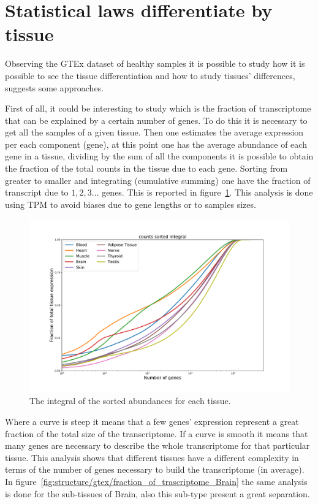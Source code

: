 \section{Statistical laws differentiate by tissue}
Observing the GTEx dataset of healthy samples it is possible to study how it is possible to see the tissue differentiation and how to study tissues' differences,~\cite{mele2014} suggests some approaches.

First of all, it could be interesting to study which is the fraction of transcriptome that can be explained by a certain number of genes.
To do this it is necessary to get all the samples of a given tissue. Then one estimates the average expression per each component (gene), at this point one has the average abundance of each gene in a tissue, dividing by the sum of all the components it is possible to obtain the fraction of the total counts in the tissue due to each gene. Sorting from greater to smaller and integrating (cumulative summing) one have the fraction of transcript due to $1, 2, 3\dots$ genes. This is reported in figure~\ref{fig:structure/gtex/fraction_of_trascriptome}. This analysis is done using TPM to avoid biases due to gene lengths or to samples sizes.
\begin{figure}[htb!]
  \centering
  \includegraphics[width=0.7\linewidth]{pictures/structure/gtex/fraction_of_trascriptome.pdf}
  \caption{The integral of the sorted abundances for each tissue.}
  \label{fig:structure/gtex/fraction_of_trascriptome}
\end{figure}
Where a curve is steep it means that a few genes' expression represent a great fraction of the total size of the transcriptome. If a curve is smooth it means that many genes are necessary to describe the whole transcriptome for that particular tissue. This analysis shows that different tissues have a different complexity in terms of the number of genes necessary to build the transcriptome (in average). In figure~\ref{fig:structure/gtex/fraction_of_trascriptome_Brain} the same analysis is done for the sub-tissues of Brain, also this sub-type present a great separation.
